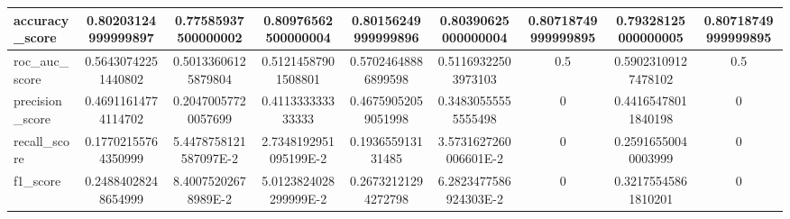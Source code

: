 \documentclass[12pt,a4paper,BCOR=.7cm,headsepline,bibliography=totoc]{report}
\begin{document}
\begin{table}[H]
\begin{latin}
\begin{adjustbox}{center}
{\begin{tabularx}{2.13\textwidth}{| l | c | c | c | c | c | c | c | c | }
	accuracy\_score & 0.80203124999999897 & 0.77585937500000002 & 0.80976562500000004 & 0.80156249999999896 & 0.80390625000000004 & 0.80718749999999895 & 0.79328125000000005 & 0.80718749999999895 \\ \hline
	roc\_auc\_score & 0.56430742251440802 & 0.50133606125879804 & 0.51214587901508801 & 0.57024648886899598 & 0.51169322503973103 & 0.5 & 0.59023109127478102 & 0.5 \\ \hline
	precision\_score & 0.46911614774114702 & 0.20470057720057699 & 0.411333333333333 & 0.46759052059051998 & 0.34830555555555498 & 0 & 0.44165478011840198 & 0 \\ \hline
	recall\_score & 0.17702155764350999 & 5.4478758121587097E-2 & 2.7348192951095199E-2 & 0.193655913131485 & 3.5731627260006601E-2 & 0 & 0.25916550040003999 & 0 \\ \hline
	f1\_score & 0.24884028248654999 & 8.40075202678989E-2 & 5.0123824028299999E-2 & 0.26732121294272798 & 6.2823477586924303E-2 & 0 & 0.32175545861810201 & 0 \\ \hline
\end{tabularx}}
\end{adjustbox}
\end{latin}
\end{table}
\end{document}
